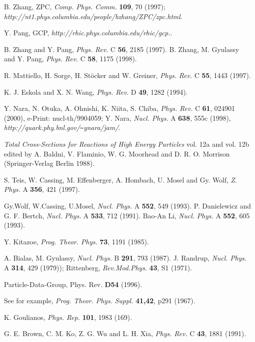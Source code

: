 \documentclass[]{article}
\def\Journal#1#2#3#4{{#1} {\bf #2}, #3 (#4)}
\def\NPA{{\em Nucl. Phys.} A}
\def\NPB{{\em Nucl. Phys.} B}
\def\PR{{\em Phys. Rev.}}
\def\PRD{{\em Phys. Rev.} D}
\def\PRC{{\em Phys. Rev.} C}
\def\ZPA{{\em Z. Phys.} A}
\def\PR{{\em Phys. Rep.}}
\def\CPC{{\em Comp. Phys. Comm.}}
\def\PTPsuppl{{\em Prog. Theor. Phys. Suppl.}}
\def\RMP{{\em Rev.Mod.Phys.}}
\def\PTP{{\em Prog. Theor. Phys.}}
\begin{document}
\begin{thebibliography}{20}
       B. Zhang, ZPC, \Journal{\CPC}{109}{70}{1997};
      {\em http://nt1.phys.columbia.edu/people/bzhang/ZPC/zpc.html}.

 Y. Pang, GCP,
    {\em http://rhic.phys.columbia.edu/rhic/gcp.}.

	B. Zhang and Y. Pang,
        \Journal{\PRC}{56}{2185}{1997}.
	B. Zhang, M. Gyulassy  and Y. Pang,
         \Journal{\PRC}{58}{1175}{1998}.

R. Mattiello, H. Sorge,  H. St\"ocker and W. Greiner,
  \Journal{\PRC}{55}{1443}{1997}.

 K. J. Eskola and X. N. Wang, \Journal{\PRD}{49}{1282}{1994}.


Y. Nara, N. Otuka, A. Ohnishi, K. Niita, S.  Chiba,
   \Journal{\PRC}{61}{024901}{2000},   e-Print: nucl-th/9904059;
Y. Nara, \Journal{\NPA}{638}{555c}{1998},
 {\em http://quark.phy.bnl.gov/\verb+~+ynara/jam/}.


{\it Total Cross-Sections for Reactions of High Energy Particles}
  vol. 12a and vol. 12b
edited by A. Baldni, V. Flaminio, W. G. Moorhead and D. R. O. Morrison
(Springer-Verlag Berlin 1988).

 S. Teis, W. Cassing, M. Effenberger, A. Hombach, U. Mosel and Gy. Wolf,
  \Journal{\ZPA}{356}{421}{1997}.


        Gy.Wolf, W.Cassing, U.Mosel,
        \Journal{\NPA}{552}{549}{1993}.
        P. Danielewicz and G. F. Bertch,
        \Journal{\NPA}{533}{712}{1991}.
        Bao-An Li, \Journal{\NPA}{552}{605}{1993}.

	Y. Kitazoe,
	\Journal{\PTP}{73}{1191}{1985}.

	A. Bialas, M. Gyulassy,
	\Journal{\NPB}{291}{793}{1987}.
 J. Randrup, \Journal{\NPA}{314}{429}{1979)};
          Rittenberg, \Journal{\RMP}{43}{S1}{1971}.

Particle-Data-Group, \newblock Phys. Rev. {\bf D54} (1996).

 See for example,
   \Journal{\PTPsuppl}{41,42}{p291}{1967}.

 K. Goulianos, \Journal{\PR}{101}{1983}{169}.


        G. E. Brown, C. M. Ko, Z. G. Wu and L. H. Xia,
        \Journal{\PRC}{43}{1881}{1991}.


\end{thebibliography}
\end{document}
